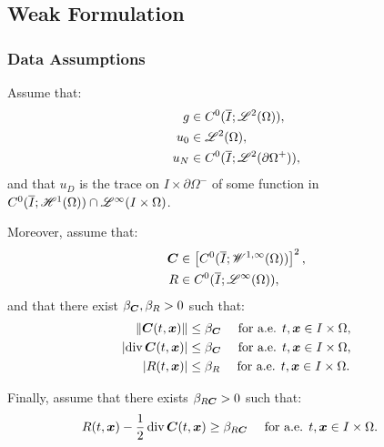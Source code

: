 \newpage
\subsection{Weak Formulation}

\subsubsection{Data Assumptions} \label{assumptions}

Assume that:
\begin{align}
    g & \in C^0(\overline{I}; \mathscr{L}^{2}(\Omega)), \\
    u_0 & \in \mathscr{L}^{2}(\Omega), \\
    u_N & \in C^0(\overline{I}; \mathscr{L}^{2}(\partial \Omega^+)),
\end{align}
and that $u_D$ is the trace on $I \times \partial \Omega^-$ of some function in $C^0(\overline{I}; \mathscr{H}^{1}(\Omega)) \cap \mathscr{L}^{\infty}(I \times \Omega)$.

Moreover, assume that:
\begin{align}
    \bm{C} & \in \left[ C^0(\overline{I}; \mathscr{W}^{1, \infty}(\Omega)) \right]^2, \\
    R & \in C^0(\overline{I}; \mathscr{L}^{\infty}(\Omega)),
\end{align}
and that there exist $\beta_{\bm{C}}, \beta_{R} > 0$ such that:
\begin{align}
    \lVert \bm{C}(t, \bm{x}) \rVert & \leq \beta_{\bm{C}} \quad \text{ for a.e. } t, \bm{x} \in I \times \Omega, \\
    \lvert \operatorname*{div} \bm{C}(t, \bm{x}) \rvert & \leq \beta_{\bm{C}} \quad \text{ for a.e. } t, \bm{x} \in I \times \Omega, \\
    \lvert R(t, \bm{x}) \rvert & \leq \beta_{R} \quad \text{ for a.e. } t, \bm{x} \in I \times \Omega.
\end{align}

Finally, assume that there exists $\beta_{R \bm{C}} > 0$ such that:
\begin{align}
    R(t, \bm{x}) - \frac{1}{2} \operatorname*{div} \bm{C}(t, \bm{x}) & \geq \beta_{R \bm{C}} \quad \text{ for a.e. } t, \bm{x} \in I \times \Omega.
\end{align}